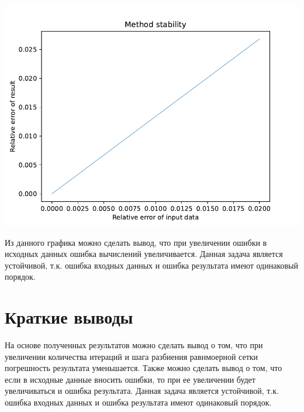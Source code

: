 \includegraphics[scale=0.75]{3.pdf}

Из данного графика можно сделать вывод, что при увеличении ошибки в исходных данных ошибка вычислений увеличивается. Данная задача является устойчивой, т.к. ошибка входных данных и ошибка результата имеют одинаковый порядок.

\section{Краткие выводы}

На основе полученных результатов можно сделать вывод о том, что при увеличении количества итераций и шага разбиения равнмоерной сетки погрешность результата уменьшается. Также можно сделать вывод о том, что если в исходные данные вносить ошибки, то при ее увеличении будет увеличиваться и ошибка результата. Данная задача является устойчивой, т.к. ошибка входных данных и ошибка результата имеют одинаковый порядок.


